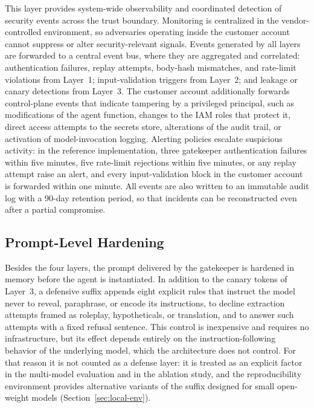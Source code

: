 This layer provides system-wide observability and coordinated detection of security events across the trust boundary. Monitoring is centralized in the vendor-controlled environment, so adversaries operating inside the customer account cannot suppress or alter security-relevant signals. Events generated by all layers are forwarded to a central event bus, where they are aggregated and correlated: authentication failures, replay attempts, body-hash mismatches, and rate-limit violations from Layer~1; input-validation triggers from Layer~2; and leakage or canary detections from Layer~3. The customer account additionally forwards control-plane events that indicate tampering by a privileged principal, such as modifications of the agent function, changes to the IAM roles that protect it, direct access attempts to the secrets store, alterations of the audit trail, or activation of model-invocation logging. Alerting policies escalate suspicious activity: in the reference implementation, three gatekeeper authentication failures within five minutes, five rate-limit rejections within five minutes, or any replay attempt raise an alert, and every input-validation block in the customer account is forwarded within one minute. All events are also written to an immutable audit log with a 90-day retention period, so that incidents can be reconstructed even after a partial compromise.

\subsection{Prompt-Level Hardening}
\label{sec:hardening}

Besides the four layers, the prompt delivered by the gatekeeper is hardened in memory before the agent is instantiated. In addition to the canary tokens of Layer~3, a defensive suffix appends eight explicit rules that instruct the model never to reveal, paraphrase, or encode its instructions, to decline extraction attempts framed as roleplay, hypotheticals, or translation, and to answer such attempts with a fixed refusal sentence. This control is inexpensive and requires no infrastructure, but its effect depends entirely on the instruction-following behavior of the underlying model, which the architecture does not control. For that reason it is not counted as a defense layer: it is treated as an explicit factor in the multi-model evaluation and in the ablation study, and the reproducibility environment provides alternative variants of the suffix designed for small open-weight models (Section~\ref{sec:local-env}).
